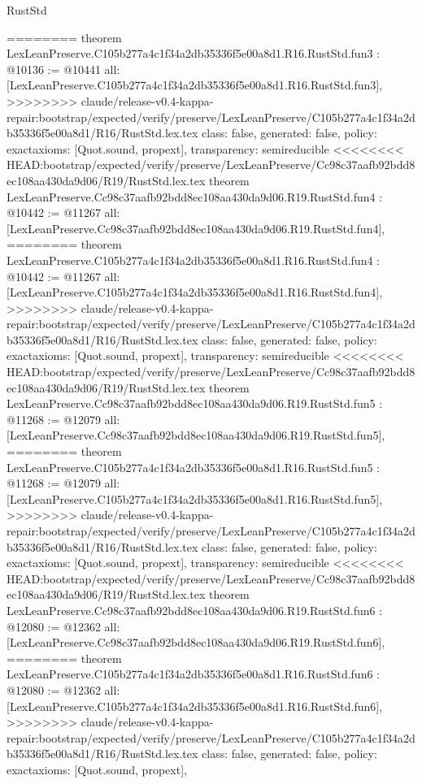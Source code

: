 \begin{lexlean}{RustStd}
\begin{coremodule}
{\begin{coremodule}
{{{{{{========
theorem LexLeanPreserve.C105b277a4c1f34a2db35336f5e00a8d1.R16.RustStd.fun3 : @10136 := @10441 {
  all: [LexLeanPreserve.C105b277a4c1f34a2db35336f5e00a8d1.R16.RustStd.fun3],
>>>>>>>> claude/release-v0.4-kappa-repair:bootstrap/expected/verify/preserve/LexLeanPreserve/C105b277a4c1f34a2db35336f5e00a8d1/R16/RustStd.lex.tex
  class: false,
  generated: false,
  policy: exact{axioms: [Quot.sound, propext]},
  transparency: semireducible
}
<<<<<<<< HEAD:bootstrap/expected/verify/preserve/LexLeanPreserve/Cc98c37aafb92bdd8ec108aa430da9d06/R19/RustStd.lex.tex
theorem LexLeanPreserve.Cc98c37aafb92bdd8ec108aa430da9d06.R19.RustStd.fun4 : @10442 := @11267 {
  all: [LexLeanPreserve.Cc98c37aafb92bdd8ec108aa430da9d06.R19.RustStd.fun4],
========
theorem LexLeanPreserve.C105b277a4c1f34a2db35336f5e00a8d1.R16.RustStd.fun4 : @10442 := @11267 {
  all: [LexLeanPreserve.C105b277a4c1f34a2db35336f5e00a8d1.R16.RustStd.fun4],
>>>>>>>> claude/release-v0.4-kappa-repair:bootstrap/expected/verify/preserve/LexLeanPreserve/C105b277a4c1f34a2db35336f5e00a8d1/R16/RustStd.lex.tex
  class: false,
  generated: false,
  policy: exact{axioms: [Quot.sound, propext]},
  transparency: semireducible
}
<<<<<<<< HEAD:bootstrap/expected/verify/preserve/LexLeanPreserve/Cc98c37aafb92bdd8ec108aa430da9d06/R19/RustStd.lex.tex
theorem LexLeanPreserve.Cc98c37aafb92bdd8ec108aa430da9d06.R19.RustStd.fun5 : @11268 := @12079 {
  all: [LexLeanPreserve.Cc98c37aafb92bdd8ec108aa430da9d06.R19.RustStd.fun5],
========
theorem LexLeanPreserve.C105b277a4c1f34a2db35336f5e00a8d1.R16.RustStd.fun5 : @11268 := @12079 {
  all: [LexLeanPreserve.C105b277a4c1f34a2db35336f5e00a8d1.R16.RustStd.fun5],
>>>>>>>> claude/release-v0.4-kappa-repair:bootstrap/expected/verify/preserve/LexLeanPreserve/C105b277a4c1f34a2db35336f5e00a8d1/R16/RustStd.lex.tex
  class: false,
  generated: false,
  policy: exact{axioms: [Quot.sound, propext]},
  transparency: semireducible
}
<<<<<<<< HEAD:bootstrap/expected/verify/preserve/LexLeanPreserve/Cc98c37aafb92bdd8ec108aa430da9d06/R19/RustStd.lex.tex
theorem LexLeanPreserve.Cc98c37aafb92bdd8ec108aa430da9d06.R19.RustStd.fun6 : @12080 := @12362 {
  all: [LexLeanPreserve.Cc98c37aafb92bdd8ec108aa430da9d06.R19.RustStd.fun6],
========
theorem LexLeanPreserve.C105b277a4c1f34a2db35336f5e00a8d1.R16.RustStd.fun6 : @12080 := @12362 {
  all: [LexLeanPreserve.C105b277a4c1f34a2db35336f5e00a8d1.R16.RustStd.fun6],
>>>>>>>> claude/release-v0.4-kappa-repair:bootstrap/expected/verify/preserve/LexLeanPreserve/C105b277a4c1f34a2db35336f5e00a8d1/R16/RustStd.lex.tex
  class: false,
  generated: false,
  policy: exact{axioms: [Quot.sound, propext]},
}}}}}}}}}}
\end{coremodule}}
\end{coremodule}
\end{lexlean}
